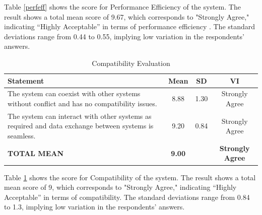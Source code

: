 	Table \ref{perfeff} shows the score for Performance Efficiency of the system. The result shows a total mean score of 9.67, which corresponds to "Strongly Agree," indicating “Highly Acceptable” in terms of performance efficiency . The standard deviations range from 0.44 to 0.55, implying low variation in the respondents’ answers.
	
	\begin{table}[h!]
		\centering
		\caption{Compatibility Evaluation}
		\label{comptbl}
		\renewcommand{\arraystretch}{1.2}
		\begin{tabularx}{\linewidth}{|X|c|c|c|}
			\hline
			\textbf{Statement} & \textbf{Mean} & \textbf{SD} & \textbf{VI} \\ \hline
			The system can coexist with other systems without conflict and has no compatibility issues.
			& 8.88 & 1.30 & Strongly Agree \\ \hline
			The system can interact with other systems as required and data exchange between systems is seamless.
			& 9.20 & 0.84 & Strongly Agree \\ \hline
			\textbf{TOTAL MEAN} & \textbf{9.00} & & \textbf{Strongly Agree} \\ \hline
		\end{tabularx}
	\end{table}
	
	Table \ref{comptbl} shows the score for Compatibility of the system. The result shows a total mean score of 9, which corresponds to "Strongly Agree," indicating “Highly Acceptable” in terms of compatibility. The standard deviations range from 0.84 to 1.3, implying low variation in the respondents’ answers.
	
